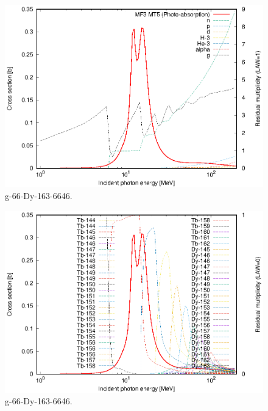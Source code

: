 \begin{figure}
 \includegraphics[width=\linewidth]{eps/g_66-Dy-163_6646.eps}
  \caption{g-66-Dy-163-6646.}
\end{figure}
\begin{figure}
 \includegraphics[width=\linewidth]{eps-law0/g_66-Dy-163_6646.eps}
 \caption{g-66-Dy-163-6646.}
\end{figure}
\newpage \clearpage

